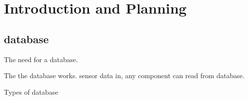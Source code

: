 \section{Introduction and Planning}

\subsection{database}
The need for a database.

The the database works. sensor data in, any component can read from database.

Types of database